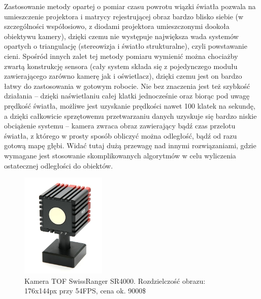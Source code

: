 Zastosowanie metody opartej o pomiar czasu powrotu wiązki światła pozwala na
umieszczenie projektora i matrycy rejestrującej obraz bardzo blisko siebie (w
szczególności współosiowo, z diodami projektora umieszczonymi dookoła obiektywu
kamery), dzięki czemu nie występuje największa wada systemów opartych o
triangulację (stereowizja i światło strukturalne), czyli powstawanie cieni.
Spośród innych zalet tej metody pomiaru wymienić można chociażby zwartą
konstrukcję sensora (cały system składa się z pojedynczego modułu zawierającego
zarówno kamerę jak i oświetlacz), dzięki czemu jest on bardzo łatwy do
zastosowania w gotowym robocie. Nie bez znaczenia jest też szybkość działania --
dzięki naświetlaniu całej klatki jednocześnie oraz biorąc pod uwagę prędkość
światła, możliwe jest uzyskanie prędkości nawet 100 klatek na sekundę, a dzięki
całkowicie sprzętowemu przetwarzaniu danych uzyskuje się bardzo niskie
obciążenie systemu -- kamera zwraca obraz zawierający bądź czas przelotu
światła, z którego w prosty sposób obliczyć można odległość, bądź od razu gotową
mapę głębi. Widać tutaj dużą przewagę nad innymi rozwiązaniami, gdzie wymagane
jest stosowanie skomplikowanych algorytmów w celu wyliczenia ostatecznej
odległości do obiektów.

\begin{figure}[h!]
\centering
\includegraphics[height=5cm]{../../Common/img/sr4000}
\caption[Kamera TOF SwissRanger SR4000]{Kamera TOF SwissRanger SR4000.
Rozdzielczość obrazu: 176x144px przy 54FPS, cena ok. 9000\$}
\label{fig:sr4000}
\end{figure}

